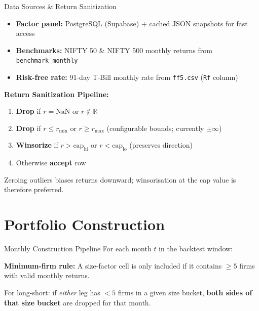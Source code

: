 \documentclass[aspectratio=169, 12pt]{beamer}
\begin{document}
\begin{frame}{Data Sources \& Return Sanitization}
  \begin{itemize}
    \item \textbf{Factor panel:} PostgreSQL (Supabase) + cached JSON snapshots for fast access
    \item \textbf{Benchmarks:} NIFTY 50 \& NIFTY 500 monthly returns from \texttt{benchmark\_monthly}
    \item \textbf{Risk-free rate:} 91-day T-Bill monthly rate from \texttt{ff5.csv} (\texttt{Rf} column)
  \end{itemize}
  \medskip
  \textbf{Return Sanitization Pipeline:}
  \begin{enumerate}
    \item \textbf{Drop} if $r = \mathrm{NaN}$ or $r \notin \mathbb{R}$
    \item \textbf{Drop} if $r \leq r_{\min}$ or $r \geq r_{\max}$ (configurable bounds; currently $\pm\infty$)
    \item \textbf{Winsorize} if $r > \text{cap}_{\mathrm{hi}}$ or $r < \text{cap}_{\mathrm{lo}}$ (preserves direction)
    \item Otherwise \textbf{accept} row
  \end{enumerate}
  Zeroing outliers biases returns downward; winsorisation at the cap value is therefore preferred.
\end{frame}

\section{Portfolio Construction}

\begin{frame}{Monthly Construction Pipeline}
  For each month $t$ in the backtest window:

  \medskip

  \vspace{6pt}
  \textbf{Minimum-firm rule:} A size-factor cell is only included if it contains
  $\geq 5$ firms with valid monthly returns.

  For long-short: if \emph{either} leg has $< 5$ firms in a given size bucket,
  \textbf{both sides of that size bucket} are dropped for that month.
\end{frame}
\end{document}
